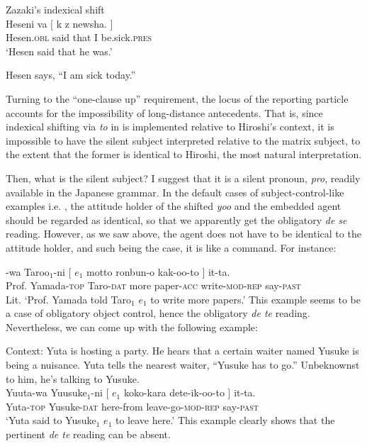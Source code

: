 \documentclass[output=paper]{langsci/langscibook}
\begin{document}
\ea\label{shimamu15} Zazaki's indexical shift  \citep[][79]{anand2006}\\ 
\gll Heseni va [ {k\textepsilon} {\textepsilon z} new\textepsilon sha. ]\\
Hesen.\textsc{obl} said {} that I be.sick.\textsc{pres} {} \\
\glt `Hesen said that he was.'\\
\begin{xlist}
\ex  Hesen says, ``I am sick today.''
\end{xlist}
\z

Turning to the ``one-clause up'' requirement, the locus of the reporting particle accounts for the impossibility of long-distance antecedents. That is, since indexical shifting via \textit{to} in  is implemented relative to Hiroshi's context, it is impossible to have the silent subject interpreted relative to the matrix subject, to the extent that the former is identical to Hiroshi, the most natural interpretation.

Then, what is the silent subject? I suggest that it is a silent pronoun, \textit{pro}, readily available in the Japanese grammar. In the default cases of subject-control-like examples i.e. , the attitude holder of the shifted \textit{yoo} and the embedded agent should be regarded as identical, so that we apparently get the obligatory \textit{de se} reading. However, as we saw above, the agent does not have to be identical to the attitude holder, and such being the case, it is like a command. For instance:

\ea\label{shimamu16} -wa Taroo$_1$-ni [ $e_{1}$ motto ronbun-o kak-oo-to ] it-ta.\\
{Prof. Yamada}-\textsc{top} Taro-\textsc{dat} {} {} more paper-\textsc{acc} write-\textsc{mod-rep} {} say-\textsc{past}\\
\glt Lit. `Prof. Yamada told Taro$_1$ $e_{1}$ to write more papers.'
\z
This example seems to be a case of obligatory object control, hence the obligatory \textit{de te} reading. Nevertheless, we can come up with the following example:

\ea\label{shimamu17} Context: Yuta is hosting a party. He hears that a certain waiter named Yusuke is being a nuisance. Yuta tells the nearest waiter, ``Yusuke has to go.'' Unbeknownst to him, he's talking to Yusuke.\\
\gll Yuuta-wa Yuusuke$_1$-ni [ $e_1$ koko-kara dete-ik-oo-to ] it-ta.\\
Yuta-\textsc{top} Yusuke-\textsc{dat} {} {} here-from leave-go-\textsc{mod-rep} {} say-\textsc{past}\\
\glt `Yuta said to Yusuke$_1$ $e_1$ to leave here.'
\z
This example clearly shows that the pertinent \textit{de te} reading can be absent.\largerpage
\end{document}
